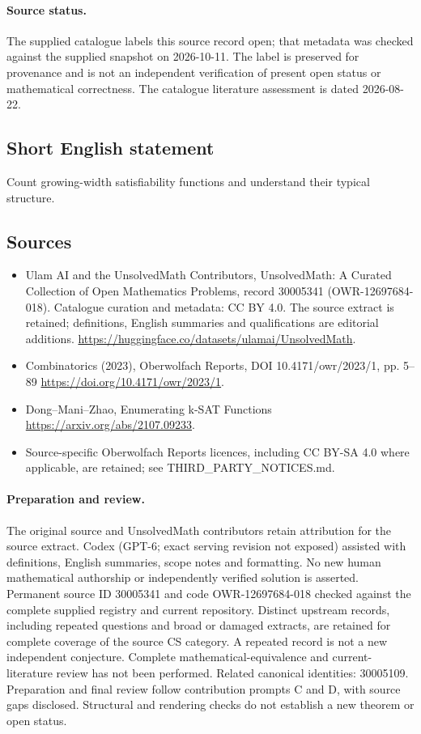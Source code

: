 \documentclass[11pt]{article}
\begin{document}
\paragraph{Source status.}
The supplied catalogue labels this source record open; that metadata was checked against the supplied snapshot on 2026-10-11. The label is preserved for provenance and is not an independent verification of present open status or mathematical correctness. The catalogue literature assessment is dated 2026-08-22.
\subsection{Short English statement}
Count growing-width satisfiability functions and understand their typical structure.
\subsection{Sources}
\begin{itemize}
\item[\hypertarget{source:30005341:1}{S1}] Ulam AI and the UnsolvedMath Contributors, UnsolvedMath: A Curated Collection of Open Mathematics Problems, record 30005341 (OWR-12697684-018). Catalogue curation and metadata: CC BY 4.0. The source extract is retained; definitions, English summaries and qualifications are editorial additions.
\url{https://huggingface.co/datasets/ulamai/UnsolvedMath}.
\item[\hypertarget{source:30005341:2}{S2}] Combinatorics (2023), Oberwolfach Reports, DOI 10.4171/owr/2023/1, pp. 5--89
\url{https://doi.org/10.4171/owr/2023/1}.
\item[\hypertarget{source:30005341:3}{S3}] Dong--Mani--Zhao, Enumerating k-SAT Functions
\url{https://arxiv.org/abs/2107.09233}.
\item Source-specific Oberwolfach Reports licences, including CC BY-SA 4.0 where applicable, are retained; see THIRD\_PARTY\_NOTICES.md.
\end{itemize}
\paragraph{Preparation and review.}
The original source and UnsolvedMath contributors retain attribution for the source extract. Codex (GPT-6; exact serving revision not exposed) assisted with definitions, English summaries, scope notes and formatting. No new human mathematical authorship or independently verified solution is asserted. Permanent source ID 30005341 and code OWR-12697684-018 checked against the complete supplied registry and current repository. Distinct upstream records, including repeated questions and broad or damaged extracts, are retained for complete coverage of the source CS category. A repeated record is not a new independent conjecture. Complete mathematical-equivalence and current-literature review has not been performed. Related canonical identities: 30005109. Preparation and final review follow contribution prompts C and D, with source gaps disclosed. Structural and rendering checks do not establish a new theorem or open status.
\label{end:30005341}
\end{document}

